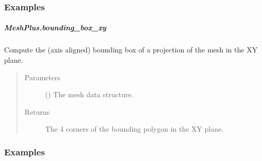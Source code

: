 \documentclass[letterpaper,10pt,english]{sphinxmanual}
\begin{document}
\begin{fulllineitems}
\begin{fulllineitems}
\begin{quote}
\begin{description}
\end{description}\end{quote}
\subsubsection*{Examples}

\begin{sphinxVerbatim}[commandchars=\\\{\}]
\end{sphinxVerbatim}

\end{fulllineitems}



\subparagraph{MeshPlus.bounding\_box\_xy}
\label{\detokenize{api/generated/directional_clustering.mesh.MeshPlus.bounding_box_xy:meshplus-bounding-box-xy}}\label{\detokenize{api/generated/directional_clustering.mesh.MeshPlus.bounding_box_xy::doc}}

\begin{fulllineitems}
\label{\detokenize{api/generated/directional_clustering.mesh.MeshPlus.bounding_box_xy:directional_clustering.mesh.MeshPlus.bounding_box_xy}}
Compute the (axis aligned) bounding box of a projection of the mesh in the XY plane.
\begin{quote}\begin{description}
\item[{Parameters}] \leavevmode
{} () \textendash{} The mesh data structure.

\item[{Returns}] \leavevmode
{} \textendash{} The 4 corners of the bounding polygon in the XY plane.

\end{description}\end{quote}
\subsubsection*{Examples}


\end{fulllineitems}
\end{fulllineitems}
\end{document}
